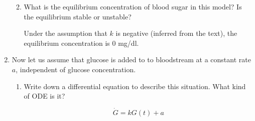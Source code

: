 \documentclass[10pt,letterpaper]{article}
\begin{document}
\begin{enumerate}
\begin{enumerate}
\begin{Solution}
      
    \end{Solution}
    \item What is the equilibrium concentration of blood sugar in this model? Is the equilibrium stable or unstable?
    
    \begin{Solution}
      Under the assumption that $k$ is negative (inferred from the text), the equilibrium concentration is $0$ mg/dl.
    \end{Solution}
    
    
    \end{enumerate}
  \item Now let us assume that glucose is added to to bloodstream at a constant rate $a$, independent of glucose concentration.
  \begin{enumerate}
    \item Write down a differential equation to describe this situation. What kind of ODE is it?
    
    \begin{Solution}
      $$ \dot G = k G(t) + a $$
    \end{Solution}
    

\end{enumerate}
\end{enumerate}
\end{document}
